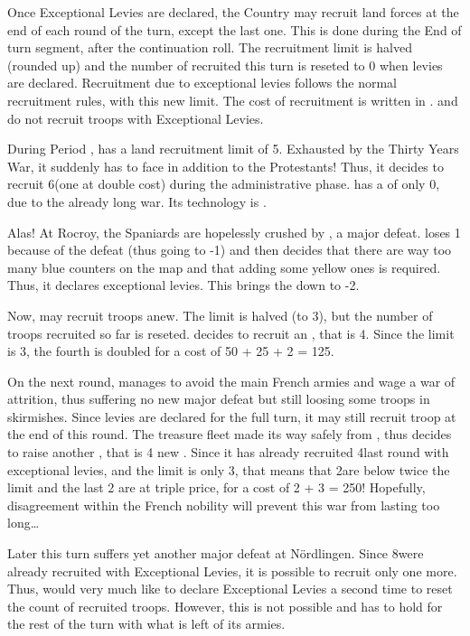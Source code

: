 \bparag Once Exceptional Levies are declared, the Country may recruit land
forces at the end of each round of the turn, except the last one. This is done
during the End of turn segment, after the continuation roll.
\bparag The recruitment limit is halved (rounded up) and the number of \LD
recruited this turn is reseted to 0 when levies are declared.
\bparag Recruitment due to exceptional levies follows the normal recruitment
rules, with this new limit.
\bparag The cost of recruitment is written in .
\bparag \SUE and \PRU do not recruit  troops with Exceptional
Levies.

\begin{exemple}
  During Period , \HIS has a land recruitment limit of
  5\LD. Exhausted by the Thirty Years War, it suddenly has to face \FRA in
  addition to the Protestants! Thus, it decides to recruit 6\LD (one at double
  cost) during the administrative phase. \HIS has a \STAB of only 0, due to
  the already long war. Its technology is \TBAR.

  Alas! At Rocroy, the Spaniards are hopelessly crushed by , a major defeat. \HIS loses 1 \STAB because of the defeat (thus
  going to -1) and then decides that there are way too many blue counters on
  the map and that adding some yellow ones is required. Thus, it declares
  exceptional levies. This brings the \STAB down to -2.

  Now, \HIS may recruit troops anew. The limit is halved (to 3\LD), but the
  number of troops recruited so far is reseted. \HIS decides to recruit an
  \ARMY\Faceplus, that is 4\LD. Since the limit is 3\LD, the fourth is doubled
  for a cost of 50 + 25 + 2  = 125\ducats.

  \smallskip

  On the next round, \HIS manages to avoid the main French armies and wage a
  war of attrition, thus suffering no new major defeat but still loosing some
  troops in skirmishes. Since levies are declared for the full turn, it may
  still recruit troop at the end of this round. The treasure fleet made its
  way safely from \continentAmerica, thus \HIS decides to raise another
  \ARMY\Faceplus, that is 4 new \LD. Since it has already recruited 4\LD last
  round with exceptional levies, and the limit is only 3\LD, that means that
  2\LD are below twice the limit and the last 2 are at triple price, for a
  cost of 2  + 3  = 250\ducats! Hopefully,
  disagreement within the French nobility will prevent this war from lasting
  too long\ldots

  \smallskip

  Later this turn \HIS suffers yet another major defeat at
  N\"{o}rdlingen. Since 8\LD were already recruited with Exceptional Levies,
  it is possible to recruit only one more. Thus, \HIS would very much like to
  declare Exceptional Levies a second time to reset the count of recruited
  troops. However, this is not possible and \HIS has to hold for the rest of
  the turn with what is left of its armies.
\end{exemple}

